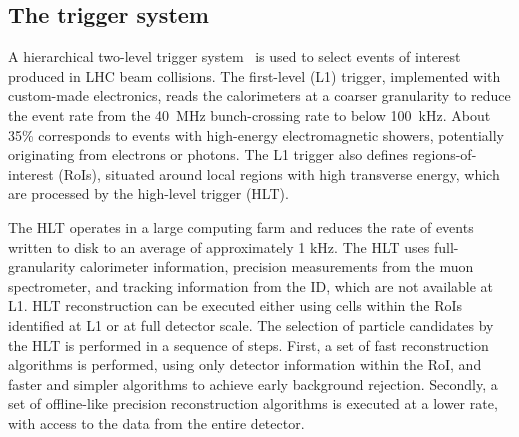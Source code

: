 % 
% 
\subsection{The trigger system}
 A hierarchical two-level trigger system~\cite{TRIG-2016-01} is used to select events of interest produced in LHC beam collisions. The first-level (L1) trigger, implemented with custom-made electronics, reads the calorimeters at a coarser granularity to reduce the event rate from the 40~MHz bunch-crossing rate to below 100~kHz. About 35\% corresponds to events with high-energy electromagnetic showers, potentially originating from electrons or photons. The L1 trigger also defines regions-of-interest (RoIs), situated around local regions with high transverse energy, which are processed by the high-level trigger (HLT). %
 
 The HLT operates in a large computing farm and reduces the rate of events written to disk to an average of approximately 1 kHz. The HLT uses full-granularity calorimeter information, precision measurements
from the muon spectrometer, and tracking information from the ID, which are not available at L1. HLT reconstruction can be executed either using cells within the RoIs identified at L1 or at full detector scale. The selection of particle candidates by the HLT is performed in a sequence of steps. First, a set of fast reconstruction algorithms is performed, using only detector information within the RoI, and faster and simpler algorithms to achieve early background rejection. Secondly, a set of offline-like precision reconstruction algorithms is executed at a lower rate, with access to the data from the entire detector.

